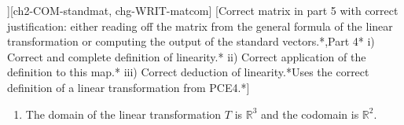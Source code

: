 \begin{SaveQuestion}
][ch2-COM-standmat, chg-WRIT-matcom] %
    [Correct matrix in part 5 with correct justification: either reading off the matrix from the general formula of the linear transformation or computing the output of the standard vectors.*,Part 4* i) Correct and complete definition of linearity.* ii) Correct application of the definition to this map.* iii) Correct deduction of linearity.*Uses the correct definition of a linear transformation from PCE4.*]    %
    \begin{enumerate}
      \item The domain of the linear transformation $T$ is $\mathbb{R}^3$ and the codomain is $\mathbb{R}^2$.
      

\end{enumerate}
\end{SaveQuestion}
